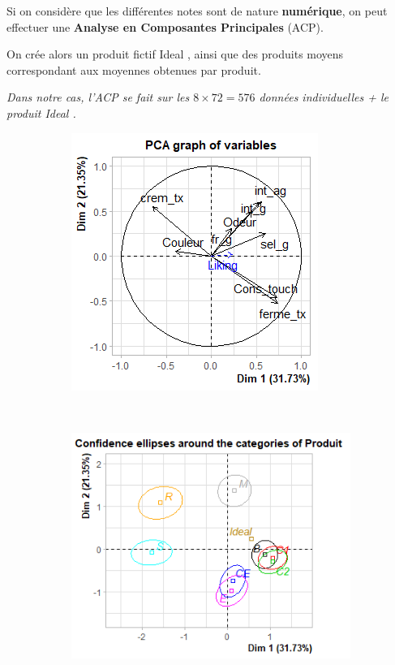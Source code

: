 \documentclass[aspectratio=169,xcolor=dvipsnames]{beamer}
\begin{document}
\begin{frame}

\textcolor{nyubluedarker}{\faCogs} Si on considère que les différentes notes sont de nature \textbf{numérique}, on peut effectuer une \textbf{Analyse en Composantes Principales} (ACP).

\medskip

\textcolor{nyubluedarker}{\faCogs} On crée alors un produit fictif \og Ideal \fg{}, ainsi que des \og produits moyens \fg{} correspondant aux moyennes obtenues par produit.

\medskip

\textcolor{nyubluedarker}{\faCogs} \emph{Dans notre cas, l'ACP se fait sur les $8\times 72 = 576$ données individuelles + le produit \og Ideal \fg{}.}

\medskip

\begin{figure}
\centering
\begin{subfigure}{0.5\textwidth}
\begin{center}
\includegraphics[scale=0.5]{pca_na_var.png}
\end{center}
\end{subfigure}~
\begin{subfigure}{0.5\textwidth}
\begin{center}
\includegraphics[scale=0.5]{pca_na_ind.png}
\end{center}
\end{subfigure}
\end{figure}

\end{frame}
\end{document}
